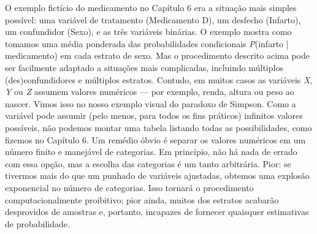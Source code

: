 \documentclass[11pt,a5paper,twoside]{book}
\begin{document}
O exemplo fictício do medicamento no Capítulo 6 era a situação mais simples possível: uma variável de tratamento (Medicamento D), um desfecho (Infarto), um confundidor (Sexo), e as três variáveis binárias. O exemplo mostra como tomamos uma média ponderada das probabilidades condicionais \textit{P}(infarto | medicamento) em cada estrato de sexo. Mas o procedimento descrito acima pode ser facilmente adaptado a situações mais complicadas, incluindo múltiplos (des)confundidores e múltiplos estratos. Contudo, em muitos casos as variáveis \textit{X}, \textit{Y} ou \textit{Z} assumem valores numéricos — por exemplo, renda, altura ou peso ao nascer. Vimos isso no nosso exemplo visual do paradoxo de Simpson. Como a variável pode assumir (pelo menos, para todos os fins práticos) infinitos valores possíveis, não podemos montar uma tabela listando todas as possibilidades, como fizemos no Capítulo 6. Um remédio óbvio é separar os valores numéricos em um número finito e manejável de categorias. Em princípio, não há nada de errado com essa opção, mas a escolha das categorias é um tanto arbitrária. Pior: se tivermos mais do que um punhado de variáveis ajustadas, obtemos uma explosão exponencial no número de categorias. Isso tornará o procedimento computacionalmente proibitivo; pior ainda, muitos dos estratos acabarão desprovidos de amostras e, portanto, incapazes de fornecer quaisquer estimativas de probabilidade.
\end{document}
